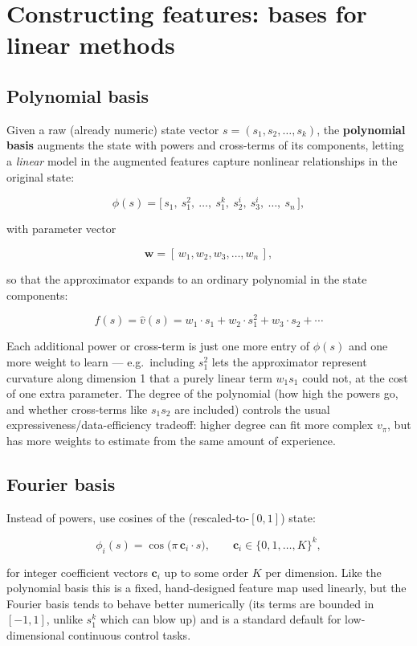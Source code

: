 \documentclass[11pt]{article}
\begin{document}
\section{Constructing features: bases for linear methods}

\subsection{Polynomial basis}

Given a raw (already numeric) state vector $s = (s_1, s_2, \dots, s_k)$,
the \textbf{polynomial basis} augments the state with powers and
cross-terms of its components, letting a \emph{linear} model in the
augmented features capture nonlinear relationships in the original state:

\[
    \phi(s) = \big[\, s_1,\ s_1^2,\ \dots,\ s_1^k,\ s_2^i,\ s_3^i,\ \dots,\ s_n \,\big],
\]

with parameter vector

\[
    \mathbf{w} = [\, w_1, w_2, w_3, \dots, w_n \,],
\]

so that the approximator expands to an ordinary polynomial in the state
components:

\[
    f(s) = \hat v(s) = w_1 \cdot s_1 + w_2 \cdot s_1^2 + w_3 \cdot s_2 + \cdots
\]

Each additional power or cross-term is just one more entry of $\phi(s)$
and one more weight to learn — e.g.\ including $s_1^2$ lets the
approximator represent curvature along dimension 1 that a purely linear
term $w_1 s_1$ could not, at the cost of one extra parameter. The degree
of the polynomial (how high the powers go, and whether cross-terms like
$s_1 s_2$ are included) controls the usual expressiveness/data-efficiency
tradeoff: higher degree can fit more complex $v_\pi$, but has more weights
to estimate from the same amount of experience.

\subsection{Fourier basis}

Instead of powers, use cosines of the (rescaled-to-$[0,1]$) state:

\[
    \phi_i(s) = \cos\!\big(\pi\, \mathbf{c}_i \cdot s\big), \qquad \mathbf{c}_i \in \{0, 1, \dots, K\}^k,
\]

for integer coefficient vectors $\mathbf{c}_i$ up to some order $K$ per
dimension. Like the polynomial basis this is a fixed, hand-designed
feature map used linearly, but the Fourier basis tends to behave better
numerically (its terms are bounded in $[-1,1]$, unlike $s_1^k$ which can
blow up) and is a standard default for low-dimensional continuous control
tasks.
\end{document}
